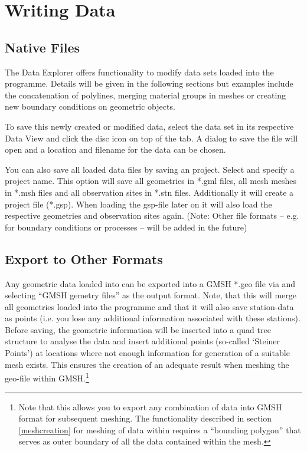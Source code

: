 \section{Writing Data}

\subsection{Native Files}

The \ogs Data Explorer offers functionality to modify data sets loaded into the programme. Details will be given in the following sections but examples include the concatenation of polylines, merging material groups in meshes or creating new boundary conditions on geometric objects.

To save this newly created or modified data, select the data set in its respective Data View and click the disc icon on top of the tab. A dialog to save the file will open and a location and filename for the data can be chosen.

You can also save all loaded data files by saving an \ogs project. Select  and specify a project name. This option will save all geometries in *.gml files, all mesh meshes in *.msh files and all observation sites in *.stn files. Additionally it will create a project file (*.gsp). When loading the gsp-file later on it will also load the respective geometries and observation sites again. (Note: Other file formats -- e.g. for boundary conditions or processes -- will be added in the future)

\subsection{Export to Other Formats}

Any geometric data loaded into \ogs can be exported into a GMSH *.geo file via  and selecting ``GMSH gemetry files'' as the output format. Note, that this will merge all geometries loaded into the programme and that it will also save station-data as points (i.e. you lose any additional information associated with these stations). Before saving, the geometric information will be inserted into a quad tree structure to analyse the data and insert additional points (so-called `Steiner Points') at locations where not enough information for generation of a suitable mesh exists. This ensures the creation of an adequate result when meshing the geo-file within GMSH.\footnote{Note that this allows you to export any combination of data into GMSH format for subsequent meshing. The functionality described in section \ref{meshcreation} for meshing of data within \ogs requires a ``bounding polygon'' that serves as outer boundary of all the data contained within the mesh.}

